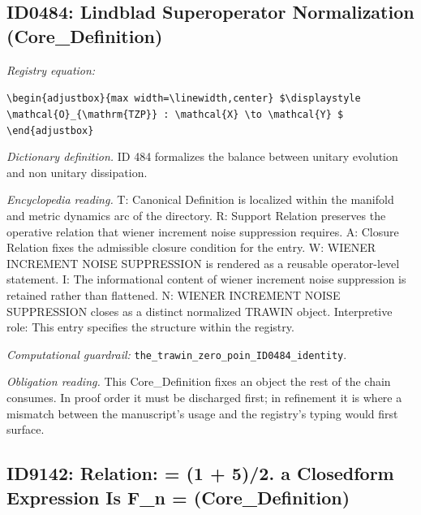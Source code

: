 \documentclass[11pt]{article}
\theoremstyle{remark}
\begin{document}
\subsection{ID0484: Lindblad Superoperator Normalization (Core\_Definition)}

\noindent\textit{Registry equation:}\par
{\small\texttt{\textbackslash{}begin\{adjustbox\}\{max width=\textbackslash{}linewidth,center\} \$\textbackslash{}displaystyle \textbackslash{}mathcal\{O\}\_\{\textbackslash{}mathrm\{TZP\}\} : \textbackslash{}mathcal\{X\} \textbackslash{}to \textbackslash{}mathcal\{Y\} \$ \textbackslash{}end\{adjustbox\}}}\par\medskip
\noindent\textit{Dictionary definition.} ID 484 formalizes the balance between unitary evolution and non unitary dissipation.\par\medskip
\noindent\textit{Encyclopedia reading.} T: Canonical Definition is localized within the manifold and metric dynamics arc of the directory. R: Support Relation preserves the operative relation that wiener increment noise suppression requires. A: Closure Relation fixes the admissible closure condition for the entry. W: WIENER INCREMENT NOISE SUPPRESSION is rendered as a reusable operator-level statement. I: The informational content of wiener increment noise suppression is retained rather than flattened. N: WIENER INCREMENT NOISE SUPPRESSION closes as a distinct normalized TRAWIN object. Interpretive role: This entry specifies the structure within the registry.
\par\medskip\noindent\textit{Computational guardrail:} \texttt{the\_trawin\_zero\_poin\_ID0484\_identity}.
\par\medskip\noindent\textit{Obligation reading.} This Core\_Definition fixes an object the rest of the chain consumes. In proof order it must be discharged first; in refinement it is where a mismatch between the manuscript's usage and the registry's typing would first surface.

\subsection{ID9142: Relation: = (1 + 5)/2. a Closedform Expression Is F\_n = (Core\_Definition)}
\end{document}
